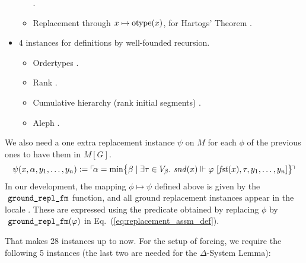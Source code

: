 \begin{itemize}
\begin{itemize}
    .
  \item Replacement through $x\mapsto \operatorname{otype}(x)$, for Hartogs' Theorem
    .
  \end{itemize}
\item
  4 instances for definitions by well-founded recursion.
  \begin{itemize}
  \item Ordertypes
    .
  \item Rank .
  \item Cumulative hierarchy (rank initial segments) .
  \item Aleph .
  \end{itemize}
\end{itemize}

We also need a one extra replacement instance $\psi$ on $M$ for each
$\phi$ of the
previous ones to have them in $M[G]$.
\[
  \psi(x,\alpha,y_1,\dots,y_n) \mathrel{\mathop:}= \ulcorner{\!\alpha = \min \bigl\{
    \beta \mid \exists\tau\in V_\beta.\  \mathit{snd}(x) \Vdash\varphi\ [\mathit{fst}(x),\tau,y_1,\dots,y_n]\bigr\}\!}\urcorner
\]
In our development, the mapping $\phi\mapsto\psi$ defined above is given by the
$\isatt{ground{\uscore}repl{\uscore}fm}$ function, and all ground replacement
instances appear in the locale . These are expressed using
the  predicate
obtained by replacing $\phi$ by
$\isatt{ground{\uscore}repl{\uscore}fm}(\phi)$ in Eq.~(\ref{eq:replacement_assm_def}).

That makes 28 instances up to now. For the setup of forcing, we
require the following 5 instances (the last two are needed for the $\Delta$-System Lemma):

